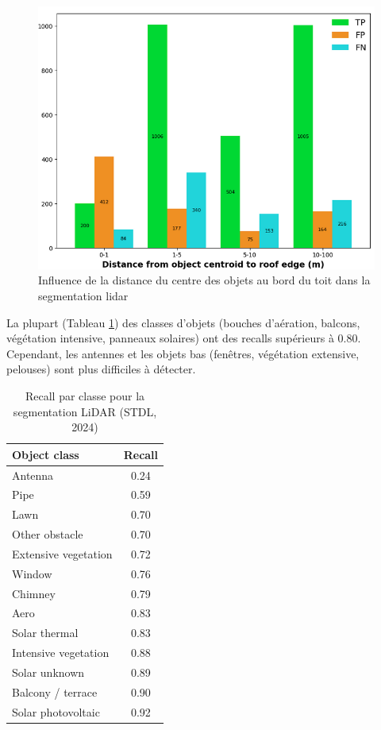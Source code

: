 {{{{\begin{figure}[H]
    \centering
    \includegraphics[width=1\linewidth]{02-main//figures/stdl_07_segmentation_lidar_distances.png}
    \caption{Influence de la distance du centre des objets au bord du toit dans la segmentation \gls{lidar} \cite{herny_detection_2024}}
    \label{fig:stdl_07_segmentation_lidar_distances}
\end{figure}
\newpage
\par{La plupart (Tableau \ref{tab:stdl_03_resultats_segmentation_lidar_classes}) des classes d'objets (bouches d'aération, balcons, végétation intensive, panneaux solaires) ont des recalls supérieurs à 0.80. Cependant, les antennes et les objets bas (fenêtres, végétation extensive, pelouses) sont plus difficiles à détecter.}

\begin{table}[H]
    \centering
    \begin{tabular}{|l|c|}
    \hline
    Object class & Recall \\
    \hline
    Antenna & 0.24 \\
    Pipe & 0.59 \\
    Lawn & 0.70 \\
    Other obstacle & 0.70 \\
    Extensive vegetation & 0.72 \\
    Window & 0.76 \\
    Chimney & 0.79 \\
    Aero & 0.83 \\
    Solar thermal & 0.83 \\
    Intensive vegetation & 0.88 \\
    Solar unknown & 0.89 \\
    Balcony / terrace & 0.90 \\
    Solar photovoltaic & 0.92 \\
    \hline
    \end{tabular}
    \caption{Recall par classe pour la segmentation LiDAR (STDL, 2024)}
    \label{tab:stdl_03_resultats_segmentation_lidar_classes}
\end{table}

}}}}
